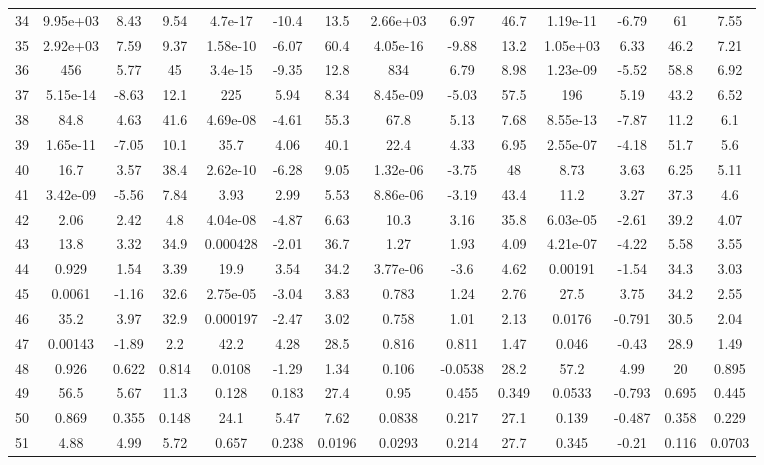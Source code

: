 \documentclass[]{aiaa-tc}%
\begin{document}
\begin{longtable}{lccccccccccccc}
34 & 9.95e+03 & 8.43 & 9.54 & 4.7e-17 & -10.4 & 13.5 & 2.66e+03 & 6.97 & 46.7 & 1.19e-11 & -6.79 & 61 & 7.55\\
35 & 2.92e+03 & 7.59 & 9.37 & 1.58e-10 & -6.07 & 60.4 & 4.05e-16 & -9.88 & 13.2 & 1.05e+03 & 6.33 & 46.2 & 7.21\\
36 & 456 & 5.77 & 45 & 3.4e-15 & -9.35 & 12.8 & 834 & 6.79 & 8.98 & 1.23e-09 & -5.52 & 58.8 & 6.92\\
37 & 5.15e-14 & -8.63 & 12.1 & 225 & 5.94 & 8.34 & 8.45e-09 & -5.03 & 57.5 & 196 & 5.19 & 43.2 & 6.52\\
38 & 84.8 & 4.63 & 41.6 & 4.69e-08 & -4.61 & 55.3 & 67.8 & 5.13 & 7.68 & 8.55e-13 & -7.87 & 11.2 & 6.1\\
39 & 1.65e-11 & -7.05 & 10.1 & 35.7 & 4.06 & 40.1 & 22.4 & 4.33 & 6.95 & 2.55e-07 & -4.18 & 51.7 & 5.6\\
40 & 16.7 & 3.57 & 38.4 & 2.62e-10 & -6.28 & 9.05 & 1.32e-06 & -3.75 & 48 & 8.73 & 3.63 & 6.25 & 5.11\\
41 & 3.42e-09 & -5.56 & 7.84 & 3.93 & 2.99 & 5.53 & 8.86e-06 & -3.19 & 43.4 & 11.2 & 3.27 & 37.3 & 4.6\\
42 & 2.06 & 2.42 & 4.8 & 4.04e-08 & -4.87 & 6.63 & 10.3 & 3.16 & 35.8 & 6.03e-05 & -2.61 & 39.2 & 4.07\\
43 & 13.8 & 3.32 & 34.9 & 0.000428 & -2.01 & 36.7 & 1.27 & 1.93 & 4.09 & 4.21e-07 & -4.22 & 5.58 & 3.55\\
44 & 0.929 & 1.54 & 3.39 & 19.9 & 3.54 & 34.2 & 3.77e-06 & -3.6 & 4.62 & 0.00191 & -1.54 & 34.3 & 3.03\\
45 & 0.0061 & -1.16 & 32.6 & 2.75e-05 & -3.04 & 3.83 & 0.783 & 1.24 & 2.76 & 27.5 & 3.75 & 34.2 & 2.55\\
46 & 35.2 & 3.97 & 32.9 & 0.000197 & -2.47 & 3.02 & 0.758 & 1.01 & 2.13 & 0.0176 & -0.791 & 30.5 & 2.04\\
47 & 0.00143 & -1.89 & 2.2 & 42.2 & 4.28 & 28.5 & 0.816 & 0.811 & 1.47 & 0.046 & -0.43 & 28.9 & 1.49\\
48 & 0.926 & 0.622 & 0.814 & 0.0108 & -1.29 & 1.34 & 0.106 & -0.0538 & 28.2 & 57.2 & 4.99 & 20 & 0.895\\
49 & 56.5 & 5.67 & 11.3 & 0.128 & 0.183 & 27.4 & 0.95 & 0.455 & 0.349 & 0.0533 & -0.793 & 0.695 & 0.445\\
50 & 0.869 & 0.355 & 0.148 & 24.1 & 5.47 & 7.62 & 0.0838 & 0.217 & 27.1 & 0.139 & -0.487 & 0.358 & 0.229\\
51 & 4.88 & 4.99 & 5.72 & 0.657 & 0.238 & 0.0196 & 0.0293 & 0.214 & 27.7 & 0.345 & -0.21 & 0.116 & 0.0703\\

\end{longtable}
\end{document}

